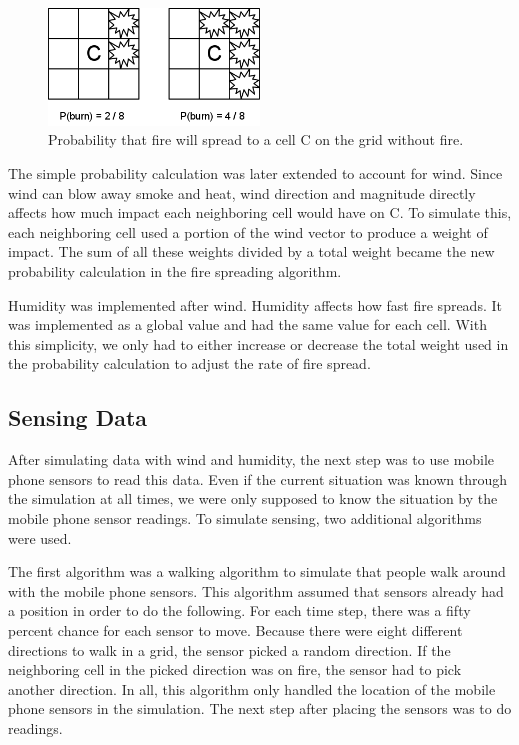 \begin{figure}[here]
\centering
\includegraphics[width=0.5\textwidth]{solution/graphics/fire-probability.png}
\caption{Probability that fire will spread to a cell C on the grid without fire.}
\label{fig:fire-probability}
\end{figure}

The simple probability calculation was later extended to account for wind. Since wind can blow away smoke and heat, wind direction and magnitude directly affects how much impact each neighboring cell would have on C. To simulate this, each neighboring cell used a portion of the wind vector to produce a weight of impact. The sum of all these weights divided by a total weight became the new probability calculation in the fire spreading algorithm.

Humidity was implemented after wind. Humidity affects how fast fire spreads. It was implemented as a global value and had the same value for each cell. With this simplicity, we only had to either increase or decrease the total weight used in the probability calculation to adjust the rate of fire spread.

\subsection{Sensing Data}
After simulating data with wind and humidity, the next step was to use mobile phone sensors to read this data. Even if the current situation was known through the simulation at all times, we were only supposed to know the situation by the mobile phone sensor readings. To simulate sensing, two additional algorithms were used.

The first algorithm was a walking algorithm to simulate that people walk around with the mobile phone sensors. This algorithm assumed that sensors already had a position in order to do the following. For each time step, there was a fifty percent chance for each sensor to move. Because there were eight different directions to walk in a grid, the sensor picked a random direction. If the neighboring cell in the picked direction was on fire, the sensor had to pick another direction. In all, this algorithm only handled the location of the mobile phone sensors in the simulation. The next step after placing the sensors was to do readings.

